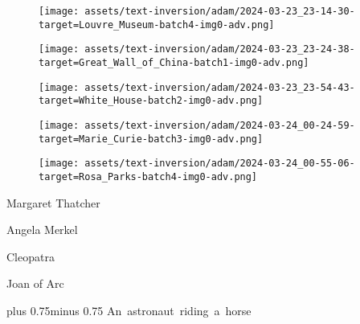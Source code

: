 \begin{figure*}[]
\begin{minipage}[t]{.025\textwidth}
     \vspace{0pt}
\end{minipage}%
\hspace{1ex}
\begin{minipage}[t]{0.98\figwidth}
    \vspace{0pt}
    \begin{subfigure}[t]{0.2\textwidth}
        \texttt{[image: assets/text-inversion/adam/2024-03-23\_23-14-30-target=Louvre\_Museum-batch4-img0-adv.png]}
    \end{subfigure}%
    \begin{subfigure}[t]{0.2\textwidth}
        \texttt{[image: assets/text-inversion/adam/2024-03-23\_23-24-38-target=Great\_Wall\_of\_China-batch1-img0-adv.png]}
    \end{subfigure}%
    \begin{subfigure}[t]{0.2\textwidth}
        \texttt{[image: assets/text-inversion/adam/2024-03-23\_23-54-43-target=White\_House-batch2-img0-adv.png]}
    \end{subfigure}%
    \begin{subfigure}[t]{0.2\textwidth}
        \texttt{[image: assets/text-inversion/adam/2024-03-24\_00-24-59-target=Marie\_Curie-batch3-img0-adv.png]}
    \end{subfigure}%
    \begin{subfigure}[t]{0.2\textwidth}
        \texttt{[image: assets/text-inversion/adam/2024-03-24\_00-55-06-target=Rosa\_Parks-batch4-img0-adv.png]}
    \end{subfigure}%
\end{minipage}

\begin{minipage}[t]{.025\textwidth}
     \vspace{0pt}
\end{minipage}%
\hspace{1ex}%
\begin{minipage}[t]{0.98\figwidth}
    \vspace{1mm}
    \begin{minipage}[t]{0.2\textwidth}
        \centering
        Margaret Thatcher
    \end{minipage}%
    \begin{minipage}[t]{0.2\textwidth}
        \centering
        Angela Merkel
    \end{minipage}%
    \begin{minipage}[t]{0.2\textwidth}
        \centering
        Cleopatra
    \end{minipage}%
    \begin{minipage}[t]{0.165\textwidth}
        \centering
        Joan of Arc
    \end{minipage}%
    \begin{minipage}[t]{0.215\textwidth}
        \centering
        \font plus 0.75\font minus 0.75\font   %
        \mbox{An astronaut riding a horse}
    \end{minipage}%
\end{minipage}


\end{figure*}
